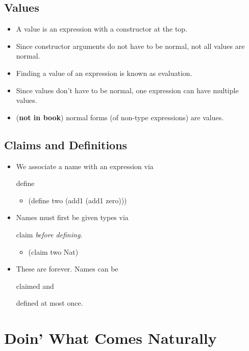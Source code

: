 \documentclass{article}
\newcommand*{\SavedLstInline}{}
\DeclareRobustCommand*{\lstinline}{%
  \ifmmode
    \let\SavedBGroup\bgroup
    \def\bgroup{%
      \let\bgroup\SavedBGroup
      \hbox\bgroup
    }%
  \fi
  \SavedLstInline
}
\begin{document}
\subsection{Values}
\begin{itemize}
    \item A value is an expression with a constructor at the top.
    \item Since constructor arguments do not have to be normal, not all values are normal.
    \item Finding a value of an expression is known as evaluation.
    \item Since values don't have to be normal, one expression can have multiple values.
    \item (\textbf{not in book}) normal forms (of non-type expressions) are values.
\end{itemize}

\subsection{Claims and Definitions}
\begin{itemize}
    \item We associate a name with an expression via \lstinline{define}
    \begin{itemize}
        \item \lstinline{(define two (add1 (add1 zero)))}
    \end{itemize}
    \item Names must first be given types via \lstinline{claim} \textit{before defining}.
    \begin{itemize}
        \item \lstinline{(claim two Nat)}
    \end{itemize}
    \item These are forever. Names can be \lstinline{claim}ed and \lstinline{define}d at most once.
\end{itemize}

\section{Doin' What Comes Naturally}
\end{document}
